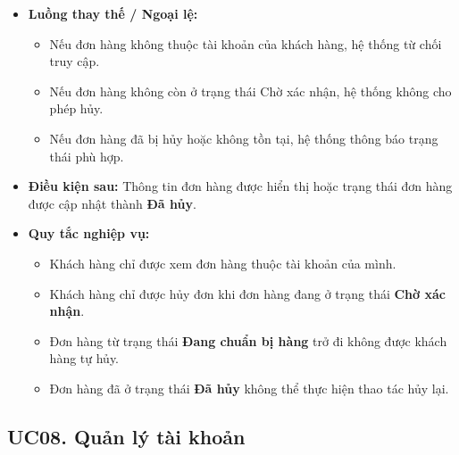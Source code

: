 \documentclass[12pt,a4paper]{article}
\begin{document}
\begin{itemize}
\begin{enumerate}
  \item Hệ thống thông báo kết quả cho khách hàng.

 \end{enumerate}

 \item \textbf{Luồng thay thế / Ngoại lệ:}

 \begin{itemize}

  \item Nếu đơn hàng không thuộc tài khoản của khách hàng, hệ thống từ chối truy cập.

  \item Nếu đơn hàng không còn ở trạng thái Chờ xác nhận, hệ thống không cho phép hủy.

  \item Nếu đơn hàng đã bị hủy hoặc không tồn tại, hệ thống thông báo trạng thái phù hợp.

 \end{itemize}

 \item \textbf{Điều kiện sau:} Thông tin đơn hàng được hiển thị hoặc trạng thái đơn hàng được cập nhật thành \textbf{Đã hủy}.

 \item \textbf{Quy tắc nghiệp vụ:}

\begin{itemize}

    \item Khách hàng chỉ được xem đơn hàng thuộc tài khoản của mình.

    \item Khách hàng chỉ được hủy đơn khi đơn hàng đang ở trạng thái \textbf{Chờ xác nhận}.

    \item Đơn hàng từ trạng thái \textbf{Đang chuẩn bị hàng} trở đi không được khách hàng tự hủy.

    \item Đơn hàng đã ở trạng thái \textbf{Đã hủy} không thể thực hiện thao tác hủy lại.

\end{itemize}

\end{itemize}


\subsection{UC08. Quản lý tài khoản}
\end{document}
